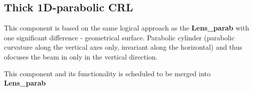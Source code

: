 \subsection*{Thick 1D-parabolic CRL}
\label{s:lens-parab-cyl}
This component is based on the same logical approach as the
\textbf{Lens\_parab} with one significant difference - geometrical surface.
Parabolic cylinder (parabolic curvature along the vertical axes only, invariant
along the horizontal) and thus ofocuses the beam in only in the vertical direction.

This component and its functionality is scheduled to be merged into \textbf{Lens\_parab}

